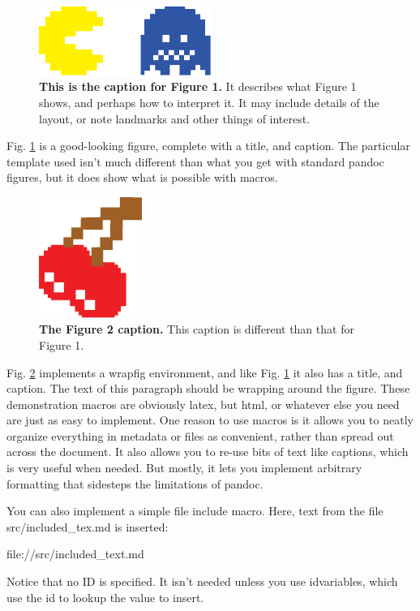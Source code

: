 \documentclass[]{article}
\author{}
\date{}
\begin{document}
\begin{figure}[!h]
\centering
\includegraphics[width=0.5\textwidth]{test/test_fig1.pdf}\vspace{-10pt}%
\caption{\textbf{This is the caption for Figure 1.} It describes what Figure 1 shows, and perhaps how to interpret it. It may include details of the layout, or note landmarks and other things of interest.}
\label{Fig1}
\end{figure}

Fig. \ref{Fig1} is a good-looking figure, complete with a title, and
caption. The particular template used isn't much different than what you
get with standard pandoc figures, but it does show what is possible with
macros.

\begin{figure}
\includegraphics[width=0.3\textwidth]{test/test_fig2.pdf}
\caption{\textbf{The Figure 2 caption.} This caption is different than that for Figure 1.}
\label{Fig2}
\end{figure}

Fig. \ref{Fig2} implements a wrapfig environment, and like Fig.
\ref{Fig1} it also has a title, and caption. The text of this paragraph
should be wrapping around the figure. These demonstration macros are
obviously latex, but html, or whatever else you need are just as easy to
implement. One reason to use macros is it allows you to neatly organize
everything in metadata or files as convenient, rather than spread out
across the document. It also allows you to re-use bits of text like
captions, which is very useful when needed. But mostly, it lets you
implement arbitrary formatting that sidesteps the limitations of pandoc.

You can also implement a simple file include macro. Here, text from the
file src/included\_tex.md is inserted:

file://src/included\_text.md

Notice that no ID is specified. It isn't needed unless you use
idvariables, which use the id to lookup the value to insert.
\end{document}
